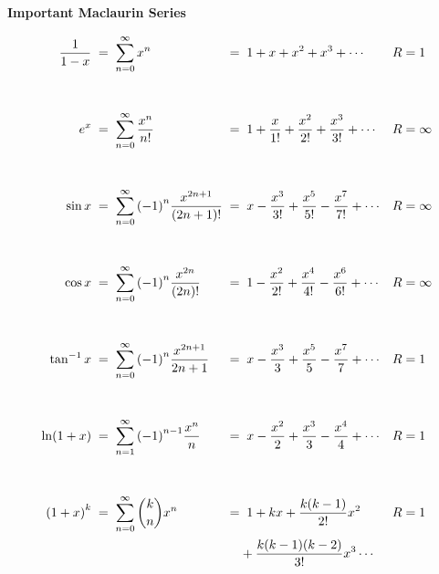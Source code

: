 \begingroup
\begin{center}
\textbf{Important Maclaurin Series}
\end{center}
\[
\setlength\jot{3em}
\begin{alignedat}{3}
\frac{1}{1-x}
\;&=\;    \sum_{n=0}^\infty  x^n
&\;&=\;   1 + x + x^2 + x^3 + \cdots
\quad&R&=1
\\
e^x
\;&=\;
\sum_{n=0}^\infty\frac{x^n}{n!}
&\;&=\;
1 + \frac{x}{1!}+\frac{x^2}{2!}+\frac{x^3}{3!}+\cdots
\quad&R&=\infty
\\
\sin x
\;&=\;
\sum_{n=0}^\infty{(-1)}^{n}\frac{x^{2n+1}}{(2n+1)!}
&\;&=\;
x - \frac{x^3}{3!}+\frac{x^5}{5!}-\frac{x^7}{7!}+\cdots
\quad&R&=\infty
\\
\cos x
\;&=\;
\sum_{n=0}^\infty  {(-1)}^{n} \frac{ x^{2n} }{ (2n)! }
&\;&=\;
1 - \frac{x^2}{2!}+\frac{x^4}{4!}-\frac{x^6}{6!}+\cdots
\quad&R&=\infty
\\
\tan^{-1} x
\;&=\;    \sum_{n=0}^\infty  {(-1)}^{n} \frac{ x^{2n+1} }{ 2n+1 }
&\;&=\;   x - \frac{x^3}{3} + \frac{x^5}{5} - \frac{x^7}{7} + \cdots
\quad&R&=1
\\
\ln(1+x)
\;&=\;    \sum_{n=1}^\infty  {(-1)}^{n-1} \frac{ x^{n} }{ n }
&\;&=\;   x - \frac{x^2}{2} + \frac{x^3}{3} - \frac{x^4}{4} + \cdots
\quad&R&=1
\\
{(1+x)}^k
\;&=\;   \sum_{n=0}^\infty  \binom{k}{n}x^n
&\;&
\begin{multlined}[t]
=\;  1 + kx + \frac{k(k-1)}{2!}x^2 \\[-2em]
                            + \frac{k(k-1)(k-2)}{3!}x^3 \cdots
\end{multlined}
\quad&R&=1
\\
\end{alignedat}
\]

\endgroup

